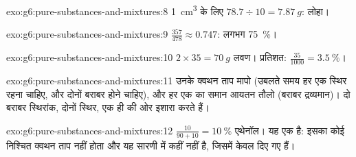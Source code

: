 \begin{solution}{exo:g6:pure-substances-and-mixtures:8}
\qty{1}{cm^3} के लिए $78.7 \div 10 = \qty{7.87}{g}$: लोहा।
\end{solution}

\begin{solution}{exo:g6:pure-substances-and-mixtures:9}
$\frac{357}{478} \approx 0.747$: लगभग \qty{75}{\percent}।
\end{solution}

\begin{solution}{exo:g6:pure-substances-and-mixtures:10}
$2 \times 35 = \qty{70}{g}$ लवण। प्रतिशत: $\frac{35}{1000} =
\qty{3.5}{\percent}$।
\end{solution}

\begin{solution}{exo:g6:pure-substances-and-mixtures:11}
उनके क्वथन ताप मापो (उबलते समय हर एक स्थिर रहना चाहिए, और दोनों
बराबर होने चाहिए), और हर एक का समान आयतन तौलो (बराबर
द्रव्यमान)। दो बराबर स्थिरांक, दोनों स्थिर, एक ही  की ओर
इशारा करते हैं।
\end{solution}

\begin{solution}{exo:g6:pure-substances-and-mixtures:12}
$\frac{10}{90 + 10} = \qty{10}{\percent}$ एथेनॉल। यह एक  है: इसका
कोई निश्चित क्वथन ताप नहीं होता और यह सारणी में कहीं नहीं है, जिसमें केवल
 दिए गए हैं।
\end{solution}

